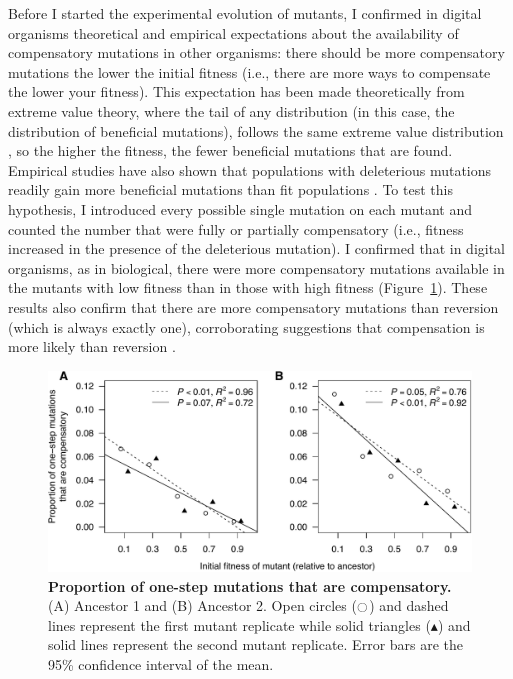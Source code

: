 \begin{doublespace}
Before I started the experimental evolution of mutants,
I confirmed in digital organisms theoretical and empirical expectations
about the availability of compensatory mutations in other organisms:
there should be more compensatory mutations the lower the initial fitness
(i.e., there are more ways to compensate the lower your fitness).
%
This expectation has been made theoretically from extreme value theory,
where the tail of any distribution
(in this case, the distribution of beneficial mutations),
follows the same extreme value distribution \citep{orr02},
so the higher the fitness, the fewer beneficial mutations that are found.
%
Empirical studies \citep[e.g.,][]{ele98,bur99} have also shown
that populations with deleterious mutations readily gain
more beneficial mutations than fit populations \citep{whi00}.
%
To test this hypothesis, I introduced every possible single mutation
on each mutant and counted the number that were fully or partially compensatory
(i.e., fitness increased in the presence of the deleterious mutation).
%
I confirmed that in digital organisms, as in biological,
there were more compensatory mutations available in the mutants
with low fitness than in those with high fitness (Figure~\ref{fig:comp_avail}).
%
These results also confirm that there are more compensatory mutations
than reversion (which is always exactly one),
corroborating suggestions that compensation is more likely than reversion
\citep{mai02}.



\begin{figure}[th!]
\begin{center}
\includegraphics[width=\linewidth]{comp-avail.pdf}
\end{center}
\caption{{\bf Proportion of one-step mutations that are compensatory.}
  (A) Ancestor 1 and (B) Ancestor 2.
  Open circles ($\ocircle$) and dashed lines
  represent the first mutant replicate
  while solid triangles ($\blacktriangle$) and solid lines
  represent the second mutant replicate.
  Error bars are the 95\% confidence interval of the mean.}
\label{fig:comp_avail}
\end{figure}




\end{doublespace}
